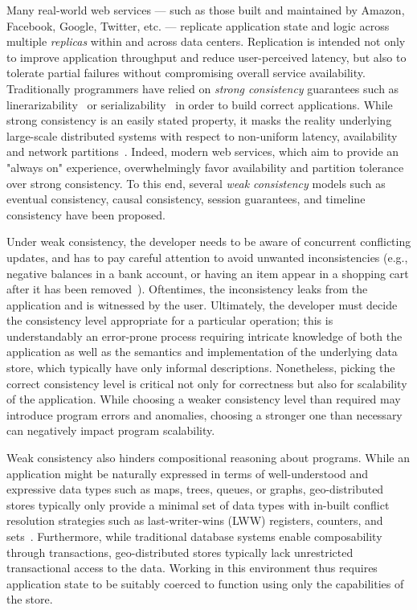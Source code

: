 Many real-world web services --- such as those built and maintained by Amazon,
Facebook, Google, Twitter, etc. --- replicate application state and logic
across multiple \emph{replicas} within and across data centers. Replication is
intended not only to improve application throughput and reduce user-perceived
latency, but also to tolerate partial failures without compromising overall
service availability. Traditionally programmers have relied on \emph{strong
consistency} guarantees such as linerarizability~\cite{Herlihy1990} or
serializability~\cite{Serializability} in order to build correct applications.
While strong consistency is an easily stated property, it masks the reality
underlying large-scale distributed systems with respect to non-uniform latency,
availability and network partitions~\cite{Brewer2000,Gilbert2002}. Indeed,
modern web services, which aim to provide an "always on" experience,
overwhelmingly favor availability and partition tolerance over strong
consistency. To this end, several \emph{weak consistency} models such as
eventual consistency, causal consistency, session guarantees, and timeline
consistency have been proposed.

Under weak consistency, the developer needs to be aware of concurrent
conflicting updates, and has to pay careful attention to avoid unwanted
inconsistencies (e.g., negative balances in a bank account, or having an item
appear in a shopping cart after it has been removed~\cite{DeCandia2007}).
Oftentimes, the inconsistency leaks from the application and is witnessed by
the user. Ultimately, the developer must decide the consistency level
appropriate for a particular operation; this is understandably an error-prone
process requiring intricate knowledge of both the application as well as the
semantics and implementation of the underlying data store, which typically have
only informal descriptions. Nonetheless, picking the correct consistency level
is critical not only for correctness but also for scalability of the
application. While choosing a weaker consistency level than required may
introduce program errors and anomalies, choosing a stronger one than necessary
can negatively impact program scalability.

Weak consistency also hinders compositional reasoning about programs.  While an
application might be naturally expressed in terms of well-understood and
expressive data types such as maps, trees, queues, or graphs, geo-distributed
stores typically only provide a minimal set of data types with in-built
conflict resolution strategies such as last-writer-wins (LWW) registers,
counters, and sets~\cite{Lakshman2010,DynamoDB}.  Furthermore, while
traditional database systems enable composability through transactions,
geo-distributed stores typically lack unrestricted transactional access to the
data.  Working in this environment thus requires application state to be
suitably coerced to function using only the capabilities of the store.

